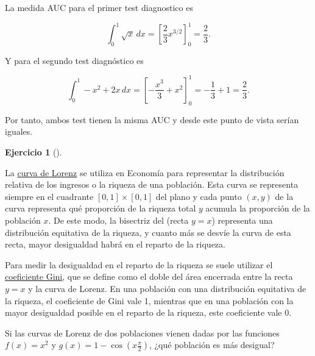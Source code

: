 \documentclass[
  a4paper,
]{scrreport}
\theoremstyle{definition}
\newtheorem{exercise}{Ejercicio}[chapter]
\theoremstyle{remark}
\begin{document}
\begin{tcolorbox}[enhanced jigsaw, colbacktitle=quarto-callout-tip-color!10!white, coltitle=black, arc=.35mm, opacityback=0, breakable, colback=white, bottomtitle=1mm, opacitybacktitle=0.6, rightrule=.15mm, colframe=quarto-callout-tip-color-frame, title=\textcolor{quarto-callout-tip-color}{\faLightbulb}\hspace{0.5em}{Solución}, toptitle=1mm, titlerule=0mm, bottomrule=.15mm, left=2mm, leftrule=.75mm, toprule=.15mm]

La medida AUC para el primer test diagnostico es

\[
\int_0^1 \sqrt{x}\,dx = \left[\frac{2}{3}x^{3/2}\right]_0^1 = \frac{2}{3}.
\]

Y para el segundo test diagnóstico es

\[
\int_0^1 -x^2+2x\,dx = \left[-\frac{x^3}{3}+x^2\right]_0^1 = -\frac{1}{3} + 1 = \frac{2}{3}.
\]

Por tanto, ambos test tienen la misma AUC y desde este punto de vista
serían iguales.

\end{tcolorbox}

\leavevmode{}%
\begin{exercise}[]\label{exr-gini}

La \href{https://es.wikipedia.org/wiki/Curva_de_Lorenz}{curva de Lorenz}
se utiliza en Economía para representar la distribución relativa de los
ingresos o la riqueza de una población. Esta curva se representa siempre
en el cuadrante \([0,1]\times [0,1]\) del plano y cada punto \((x,y)\)
de la curva representa qué proporción de la riqueza total \(y\) acumula
la proporción de la población \(x\). De este modo, la bisectriz del
(recta \(y=x\)) representa una distribución equitativa de la riqueza, y
cuanto más se desvíe la curva de esta recta, mayor desigualdad habrá en
el reparto de la riqueza.

Para medir la desigualdad en el reparto de la riqueza se suele utilizar
el \href{https://es.wikipedia.org/wiki/Coeficiente_de_Gini}{coeficiente
Gini}, que se define como el doble del área encerrada entre la recta
\(y=x\) y la curva de Lorenz. En una población con una distribución
equitativa de la riqueza, el coeficiente de Gini vale 1, mientras que en
una población con la mayor desigualdad posible en el reparto de la
riqueza, este coeficiente vale 0.

Si las curvas de Lorenz de dos poblaciones vienen dadas por las
funciones \(f(x)=x^2\) y \(g(x)=1-\cos\left(x\frac{\pi}{2}\right)\),
¿qué población es más desigual?

\end{exercise}
\end{document}
